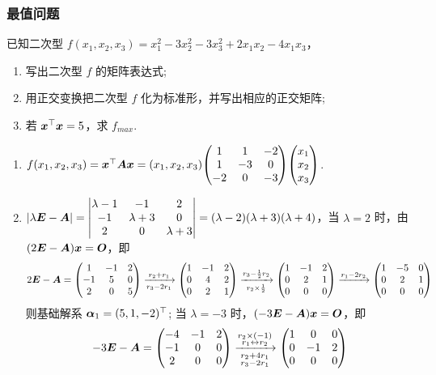 \subsubsection{最值问题}

\begin{example}
    已知二次型 $f(x_1,x_2,x_3)=x_1^2-3x_2^2-3x_3^2+2x_1x_2-4x_1x_3$，
    \begin{enumerate}[label=(\arabic{*})]
        \item 写出二次型 $f$ 的矩阵表达式;
        \item 用正交变换把二次型 $f$ 化为标准形，并写出相应的正交矩阵;
        \item 若 $\vb*{x}^\top\vb*{x}=5$，求 $f_{max}.$
    \end{enumerate}
\end{example}
\begin{solution}
    \begin{enumerate}[label=(\arabic{*})]
        \item $f(x_1,x_2,x_3)=\vb*{x}^\top\vb*{Ax}=(x_1,x_2,x_3)\mqty(1&1&-2\\1&-3&0\\-2&0&-3)\mqty(x_1\\x_2\\x_3)$.
        \item $|\lambda\vb*{E}-\vb*{A}|=\mqty|\lambda-1&-1&2\\-1&\lambda+3&0\\2&0&\lambda+3|=(\lambda-2)(\lambda+3)(\lambda+4)$，当 $\lambda=2$ 时，由 $(2\vb*{E}-\vb*{A})\vb*{x}=\vb*{O}$，即
              $$2\vb*{E}-\vb*{A}=\mqty(1&-1&2\\-1&5&0\\2&0&5)\xrightarrow[r_3-2r_1]{r_2+r_1}\mqty(1&-1&2\\0&4&2\\0&2&1)\xrightarrow[r_2\times\frac{1}{2}]{r_3-\frac{1}{2}r_2}\mqty(1&-1&2\\0&2&1\\0&0&0)\xrightarrow{r_1-2r_2}\mqty(1&-5&0\\0&2&1\\0&0&0)$$
              则基础解系 $\vb*{\alpha}_1=(5,1,-2)^\top$; 当 $\lambda=-3$ 时，$(-3\vb*{E}-\vb*{A})\vb*{x}=\vb*{O}$，即
              $$-3\vb*{E}-\vb*{A}=\mqty(-4&-1&2\\-1&0&0\\2&0&0)\xrightarrow[\substack{r_2+4r_1\\r_3-2r_1}]{\substack{r_2\times(-1)\\r_1\leftrightarrow r_2}}\mqty(1&0&0\\0&-1&2\\0&0&0)$$

\end{enumerate}
\end{solution}
